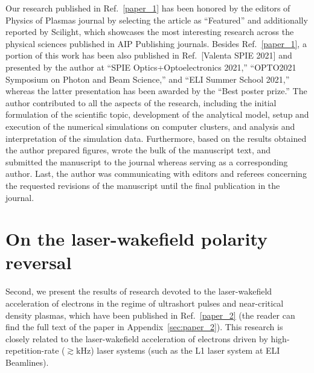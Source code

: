 \documentclass[10pt, a4paper, twoside, openright]{report}
\newcommand{\q}[1]{``#1''} %
\begin{document}
Our research published in Ref.~\ref{paper_1} has been honored by the editors of Physics of Plasmas journal by selecting the article as \q{Featured} and additionally reported by Scilight, which showcases the most interesting research across the physical sciences published in AIP Publishing journals. Besides Ref.~\ref{paper_1}, a portion of this work has been also published in Ref.~[Valenta SPIE 2021] and presented by the author at \q{SPIE Optics+Optoelectronics 2021,} \q{OPTO2021 Symposium on Photon and Beam Science,} and \q{ELI Summer School 2021,} whereas the latter presentation has been awarded by the \q{Best poster prize.} The author contributed to all the aspects of the research, including the initial formulation of the scientific topic, development of the analytical model, setup and execution of the numerical simulations on computer clusters, and analysis and interpretation of the simulation data. Furthermore, based on the results obtained the author prepared figures, wrote the bulk of the manuscript text, and submitted the manuscript to the journal whereas serving as a corresponding author. Last, the author was communicating with editors and referees concerning the requested revisions of the manuscript until the final publication in the journal.

\section{On the laser-wakefield polarity reversal\label{sec:on_the_laser-wakefield_polarity_reversal}}
%

Second, we present the results of research devoted to the laser-wakefield acceleration of electrons in the regime of ultrashort pulses and near-critical density plasmas, which have been published in Ref.~\ref{paper_2} (the reader can find the full text of the paper in Appendix~\ref{sec:paper_2}). This research is closely related to the laser-wakefield acceleration of electrons driven by high-repetition-rate ($ \gtrsim \mathrm{kHz} $) laser systems (such as the L1 laser system at ELI Beamlines). 
\end{document}
